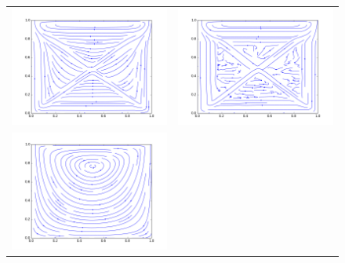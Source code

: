 \begin{figure}
	\centering
	\begin{tabulary}{\linewidth}{c c}
		\includegraphics[width=\figwid]{figs/lid/bingham_100_bgk-5_Bn100_Re100/sl_step-000050000}
		&
		\includegraphics[width=\figwid]{figs/lid/bingham_100_bgk-8_Bn100_Re100/sl_step-000050000}
		\\
		\includegraphics[width=\figwid]{figs/lid/bingham_100_svec-8_Bn100_Re100/sl_step-000050000}

\end{tabulary}
\end{figure}
